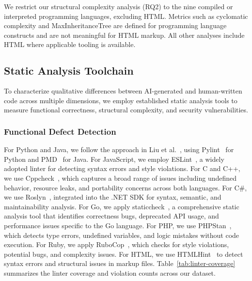 We restrict our structural complexity analysis (RQ2) to the nine compiled or interpreted programming languages, excluding HTML. Metrics such as cyclomatic complexity and MaxInheritanceTree are defined for programming language constructs and are not meaningful for HTML markup. All other analyses include HTML where applicable tooling is available.


\subsection{Static Analysis Toolchain}
\label{sec:static_analysis}
To characterize qualitative differences between AI-generated and human-written code across multiple dimensions, we employ established static analysis tools to measure functional correctness, structural complexity, and security vulnerabilities.

\subsubsection{Functional Defect Detection}
For Python and Java, we follow the approach in Liu et al.~\cite{Liu2023}, using Pylint~\cite{Pylint} for Python and PMD~\cite{PMD} for Java. For JavaScript, we employ ESLint~\cite{ESLint}, a widely adopted linter for detecting syntax errors and style violations. For C and C++, we use Cppcheck~\cite{Cppcheck}, which captures a broad range of issues including undefined behavior, resource leaks, and portability concerns across both languages. For C\#, we use Roslyn~\cite{Roslyn}, integrated into the .NET SDK for syntax, semantic, and maintainability analysis. For Go, we apply staticcheck~\cite{staticcheck2024}, a comprehensive static analysis tool that identifies correctness bugs, deprecated API usage, and performance issues specific to the Go language. For PHP, we use PHPStan~\cite{phpstan2024}, which detects type errors, undefined variables, and logic mistakes without code execution. For Ruby, we apply RuboCop~\cite{rubocop2024}, which checks for style violations, potential bugs, and complexity issues. For HTML, we use HTMLHint~\cite{htmlhint2024} to detect syntax errors and structural issues in markup files. Table~\ref{tab:linter-coverage} summarizes the linter coverage and violation counts across our dataset.

